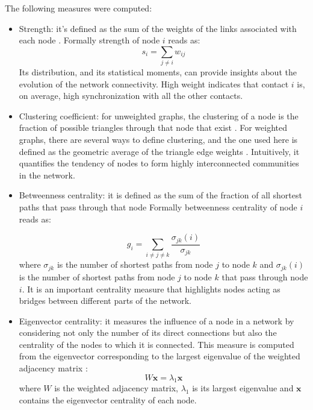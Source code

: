The following measures were computed:
\begin{itemize}
    \item Strength: it's defined as the sum of the weights of the links
    associated with each node \cite{networks-weighted}.
    Formally strength of node $i$ reads as:
    \begin{equation}
        s_i = \sum_{j\neq i}{w_{ij}}
    \end{equation}
    Its distribution, and its statistical moments, can provide insights
    about the evolution of the network connectivity.
    High weight indicates that contact $i$ is, on average, high
    synchronization with all the other contacts.

    \item Clustering coefficient: for unweighted graphs, the clustering of a
    node is the fraction of possible triangles through that node that exist 
    \cite{networks-clustering2}.
    For weighted graphs, there are several ways to define clustering, and the
    one used here is defined as the geometric average of the triangle edge
    weights \cite{networks-clustering}.
    Intuitively, it quantifies the tendency of nodes to form highly
    interconnected communities in the network.

    \item Betweenness centrality: it is defined as the sum of the fraction of
    all shortest paths that pass through that node \cite{networks-betw}
    Formally betweenness
    centrality of node $i$ reads as:

     
    \begin{equation}
        g_i = \sum_{i\neq j\neq k}{\frac{\sigma_{jk}(i)}{\sigma_{jk}}}
    \end{equation}
    where $\sigma_{jk}$ is the number of shortest paths from node $j$ to node $k$
    and $\sigma_{jk}(i)$ is the number of shortest paths from node $j$ to node $k$
    that pass through node $i$.
    It is an important centrality measure that highlights nodes acting as
    bridges between different parts of the network.

    \item Eigenvector centrality: it measures the influence of a node in a
    network by considering not only the number of its direct connections but
    also the centrality of the nodes to which it is connected.
    This measure is computed from the eigenvector corresponding to the largest
    eigenvalue of the weighted adjacency matrix \cite{networks-eigen}:
    \begin{equation}
        W\mathbf{x} = \lambda_1\mathbf{x}
    \end{equation}
    where $W$ is the weighted adjacency matrix, $\lambda_1$ is its largest
    eigenvalue and $\mathbf{x}$ contains the eigenvector centrality of each node.
\end{itemize}


